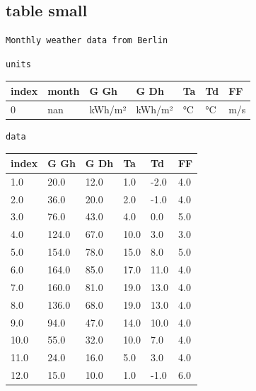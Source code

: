 \documentclass[reprint, floatfix, groupaddress, prb]{article}
\newcommand{\prompt}[4]{
        \ttfamily\llap{{\color{#2}[#3]:\hspace{3pt}#4}}\vspace{-\baselineskip}
    }
\begin{document}
    \hypertarget{table-small}{%
\subsection{table small}\label{table-small}}

    \begin{Verbatim}[commandchars=\\\{\}]
Monthly weather data from Berlin
    \end{Verbatim}

    \begin{Verbatim}[commandchars=\\\{\}]
units
    \end{Verbatim}
 
            
\prompt{Out}{outcolor}{8}{}
    
    \begin{table}[ht] 
\begin{tabular}[l]{lllllll}
\toprule
index & month & G Gh & G Dh & Ta & Td & FF\\ 
\midrule
0 & nan & kWh/m² & kWh/m² & °C & °C & m/s\\ 
\bottomrule 
 \end{tabular}
\end{table}

    

    \begin{Verbatim}[commandchars=\\\{\}]
data
    \end{Verbatim}
 
            
\prompt{Out}{outcolor}{9}{}
    
    \begin{table}[ht] 
\begin{tabular}[l]{llllll}
\toprule
index & G Gh & G Dh & Ta & Td & FF\\ 
\midrule
1.0 & 20.0 & 12.0 & 1.0 & -2.0 & 4.0\\ 
2.0 & 36.0 & 20.0 & 2.0 & -1.0 & 4.0\\ 
3.0 & 76.0 & 43.0 & 4.0 & 0.0 & 5.0\\ 
4.0 & 124.0 & 67.0 & 10.0 & 3.0 & 3.0\\ 
5.0 & 154.0 & 78.0 & 15.0 & 8.0 & 5.0\\ 
6.0 & 164.0 & 85.0 & 17.0 & 11.0 & 4.0\\ 
7.0 & 160.0 & 81.0 & 19.0 & 13.0 & 4.0\\ 
8.0 & 136.0 & 68.0 & 19.0 & 13.0 & 4.0\\ 
9.0 & 94.0 & 47.0 & 14.0 & 10.0 & 4.0\\ 
10.0 & 55.0 & 32.0 & 10.0 & 7.0 & 4.0\\ 
11.0 & 24.0 & 16.0 & 5.0 & 3.0 & 4.0\\ 
12.0 & 15.0 & 10.0 & 1.0 & -1.0 & 6.0\\ 
\bottomrule 
 \end{tabular}
\end{table}
\end{document}
